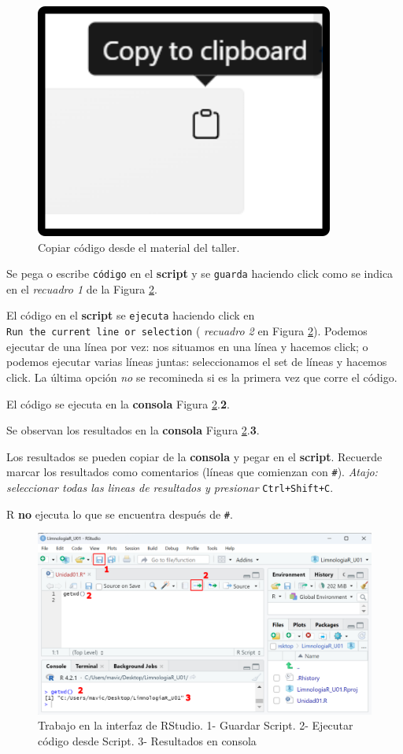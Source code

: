 \documentclass[
]{book}
\begin{document}
\begin{figure}

{\centering \includegraphics[width=0.3\linewidth]{./images/copycode} 

}

\caption{Copiar código desde el material del taller.}\label{fig:copycode}
\end{figure}

Se pega o escribe \texttt{código} en el \textbf{script} y se \texttt{guarda} haciendo click como se indica en el \emph{recuadro 1} de la Figura \ref{fig:code}.

El código en el \textbf{script} se \texttt{ejecuta} haciendo click en \texttt{Run\ the\ current\ line\ or\ selection} ( \emph{recuadro 2} en Figura \ref{fig:code}). Podemos ejecutar de una línea por vez: nos situamos en una línea y hacemos click; o podemos ejecutar varias líneas juntas: seleccionamos el set de líneas y hacemos click. La última opción \emph{no} se recomineda si es la primera vez que corre el código.

El código se ejecuta en la \textbf{consola} Figura \ref{fig:code}.\textbf{2}.

Se observan los resultados en la \textbf{consola} Figura \ref{fig:code}.\textbf{3}.

Los resultados se pueden copiar de la \textbf{consola} y pegar en el \textbf{script}. Recuerde marcar los resultados como comentarios (líneas que comienzan con \texttt{\#}). \emph{Atajo: seleccionar todas las lineas de resultados y presionar} \texttt{Ctrl+Shift+C}.

R \textbf{no} ejecuta lo que se encuentra después de \texttt{\#}.

\begin{figure}

{\centering \includegraphics[width=1\linewidth]{./images/code} 

}

\caption{Trabajo en la interfaz de RStudio. 1- Guardar Script. 2- Ejecutar código desde Script. 3- Resultados en consola}\label{fig:code}
\end{figure}
\end{document}
